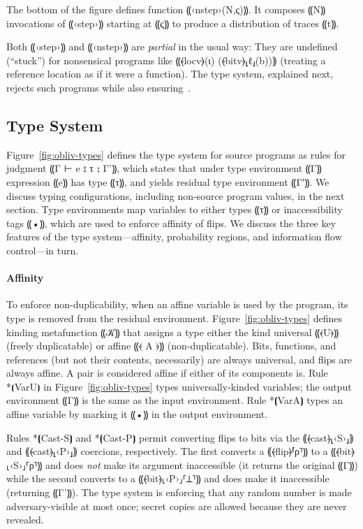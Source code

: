 The bottom of the figure defines function ⸨‹nstep›(N,ς)⸩. It composes ⸨N⸩
invocations of ⸨‹step›⸩ starting at ⸨ς⸩ to produce a distribution of traces ⸨t⸩.

Both ⸨‹step›⸩ and ⸨‹nstep›⸩ are \emph{partial} in the usual way:
They are undefined (``stuck'') for nonsensical programs like
⸨⦑locv⦒(ι) (⦑bitv⦒⸤ℓ⸥(b))⸩ (treating a reference location as if it were
a function). The \obliv type system, explained next, rejects
such programs while also ensuring~.


\subsection{Type System}
\label{subsec:obliv-design-types}

Figure~\ref{fig:obliv-types} defines the type system for \obliv source programs
as rules for judgment ⸨Γ ⊢ e ⦂ τ ⨟ Γ'⸩, which states that under type
environment ⸨Γ⸩ expression ⸨e⸩ has type ⸨τ⸩, and yields residual type
environment ⸨Γ′⸩. We discuss typing configurations, including non-source
program values, in the next section. Type environments map variables to either
types ⸨τ⸩ or inaccessibility tags ⸨•⸩, which are used to enforce
affinity of flips. We discuss the three key features of the type
system---affinity, probability regions, and information flow
control---in turn.

\paragraph*{Affinity}
%
To enforce non-duplicability, when an affine variable is used by the
program, its type is removed from the residual
environment. Figure~\ref{fig:obliv-types} defines kinding metafunction ⸨𝒦⸩
that assigns a type either the kind universal ⸨⦑U⦒⸩ (freely duplicatable) or
affine ⸨⦑ A ⦒⸩ (non-duplicatable). Bits, functions, and references (but not
their contents, necessarily) are always universal,
and flips are always affine. A pair is considered affine if either of
its components is. Rule *⦗VarU⦘ in Figure~\ref{fig:obliv-types} types
universally-kinded variables; the output environment ⸨Γ⸩ is the same
as the input environment. Rule *⦗VarA⦘ types an affine variable by
marking it ⸨•⸩ in the output environment.

Rules *⦗Cast-S⦘ and *⦗Cast-P⦘ permit converting flips to bits
via the ⸨⦑cast⦒⸤‹S›⸥⸩ and ⸨⦑cast⦒⸤‹P›⸥⸩ coercions, respectively. The
first converts a ⸨⦑flip⦒⸢ρ⸣⸩ to a ⸨⦑bit⦒⸤‹S›⸥⸢ρ⸣⸩ and does \emph{not} make
its argument inaccessible (it returns the original ⸨Γ⸩) while the
second converts to a ⸨⦑bit⦒⸤‹P›⸥⸢⊥⸣⸩ and does make it inaccessible
(returning ⸨Γ'⸩). The type system is enforcing that any
random number is made adversary-visible at most once; secret copies
are allowed because they are never revealed.

